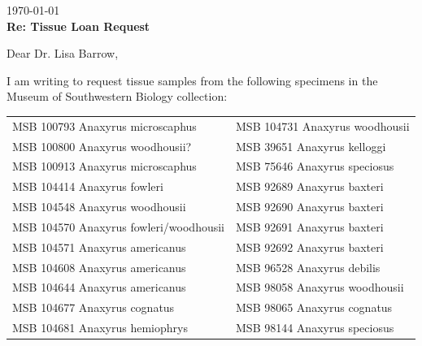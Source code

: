 \documentclass[fontsize=11pt,]{article}
\begin{document}
\vspace*{-3\baselineskip}
\BgThispage
\hfill \today\\
\vspace{2mm}
\textbf{Re: Tissue Loan Request}\\
\vspace{2mm}

Dear Dr. Lisa Barrow, \\

\vspace{2mm}

I am writing to request tissue samples from the following specimens in the
Museum of Southwestern Biology collection:

\vspace*{-2mm}

\begin{table}[h]
\begin{tabular}{ll}
MSB 100793 Anaxyrus microscaphus &  MSB 104731 Anaxyrus woodhousii  \\
MSB 100800 Anaxyrus woodhousii?  &  MSB 39651 Anaxyrus kelloggi  \\
MSB 100913 Anaxyrus microscaphus &  MSB 75646 Anaxyrus speciosus  \\
MSB 104414 Anaxyrus fowleri &  MSB 92689 Anaxyrus baxteri  \\
MSB 104548 Anaxyrus woodhousii &  MSB 92690 Anaxyrus baxteri  \\
MSB 104570 Anaxyrus fowleri/woodhousii &  MSB 92691 Anaxyrus baxteri  \\
MSB 104571 Anaxyrus americanus &  MSB 92692 Anaxyrus baxteri  \\
MSB 104608 Anaxyrus americanus &  MSB 96528 Anaxyrus debilis  \\
MSB 104644 Anaxyrus americanus &  MSB 98058 Anaxyrus woodhousii  \\
MSB 104677 Anaxyrus cognatus &  MSB 98065 Anaxyrus cognatus  \\
MSB 104681 Anaxyrus hemiophrys &  MSB 98144 Anaxyrus speciosus  \\
\end{tabular}
\end{table}

\vspace*{-2mm}
\end{document}
